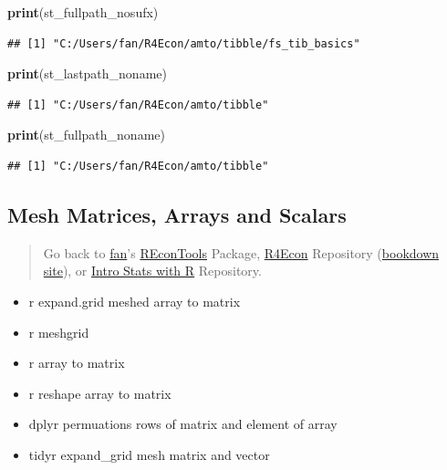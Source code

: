 \documentclass[
]{book}
\newenvironment{Shaded}{\begin{snugshade}}{\end{snugshade}}
\newcommand{\KeywordTok}[1]{\textcolor[rgb]{0.13,0.29,0.53}{\textbf{#1}}}
\newcommand{\NormalTok}[1]{#1}
\providecommand{\tightlist}{%
  \setlength{\itemsep}{0pt}\setlength{\parskip}{0pt}}
\begin{document}
\begin{Shaded}
\begin{Highlighting}[]
\KeywordTok{print}\NormalTok{(st_fullpath_nosufx)}
\end{Highlighting}
\end{Shaded}

\begin{verbatim}
## [1] "C:/Users/fan/R4Econ/amto/tibble/fs_tib_basics"
\end{verbatim}

\begin{Shaded}
\begin{Highlighting}[]
\KeywordTok{print}\NormalTok{(st_lastpath_noname)}
\end{Highlighting}
\end{Shaded}

\begin{verbatim}
## [1] "C:/Users/fan/R4Econ/amto/tibble"
\end{verbatim}

\begin{Shaded}
\begin{Highlighting}[]
\KeywordTok{print}\NormalTok{(st_fullpath_noname)}
\end{Highlighting}
\end{Shaded}

\begin{verbatim}
## [1] "C:/Users/fan/R4Econ/amto/tibble"
\end{verbatim}

\hypertarget{mesh-matrices-arrays-and-scalars}{%
\subsection{Mesh Matrices, Arrays and Scalars}\label{mesh-matrices-arrays-and-scalars}}

\begin{quote}
Go back to \href{http://fanwangecon.github.io/}{fan}'s \href{https://fanwangecon.github.io/REconTools/}{REconTools} Package, \href{https://fanwangecon.github.io/R4Econ/}{R4Econ} Repository (\href{https://fanwangecon.github.io/R4Econ/bookdown}{bookdown site}), or \href{https://fanwangecon.github.io/Stat4Econ/}{Intro Stats with R} Repository.
\end{quote}

\begin{itemize}
\tightlist
\item
  r expand.grid meshed array to matrix
\item
  r meshgrid
\item
  r array to matrix
\item
  r reshape array to matrix
\item
  dplyr permuations rows of matrix and element of array
\item
  tidyr expand\_grid mesh matrix and vector
\end{itemize}
\end{document}
